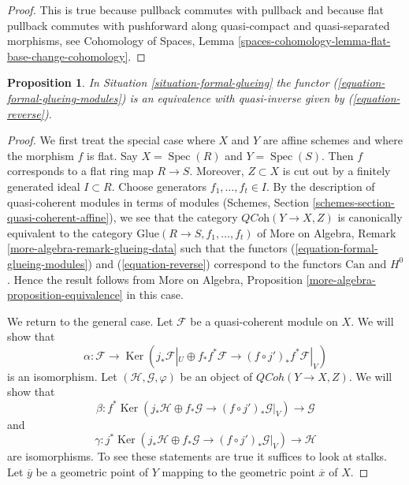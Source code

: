 \documentclass{stacks-project}
\theoremstyle{plain}
\newtheorem{proposition}[subsection]{Proposition}
\theoremstyle{definition}
\theoremstyle{remark}
\numberwithin{equation}{subsection}
\def\Spec{\mathop{\mathrm{Spec}}}
\def\QCoh{\mathit{QCoh}}
\def\Ker{\mathop{\mathrm{Ker}}}
\begin{document}
\begin{proof}
This is true because pullback commutes with pullback and because
flat pullback commutes with pushforward along quasi-compact
and quasi-separated morphisms, see
Cohomology of Spaces, Lemma
\ref{spaces-cohomology-lemma-flat-base-change-cohomology}.
\end{proof}

\begin{proposition}
\label{proposition-formal-glueing-modules}
In Situation \ref{situation-formal-glueing} the functor
(\ref{equation-formal-glueing-modules}) is an equivalence
with quasi-inverse given by (\ref{equation-reverse}).
\end{proposition}

\begin{proof}
We first treat the special case where $X$ and $Y$ are affine schemes
and where the morphism $f$ is flat. Say $X = \Spec(R)$ and $Y = \Spec(S)$.
Then $f$ corresponds to a flat ring map $R \to S$. Moreover, $Z \subset X$
is cut out by a finitely generated ideal $I \subset R$. Choose generators
$f_1, \ldots, f_t \in I$. By the description of quasi-coherent modules
in terms of modules
(Schemes, Section \ref{schemes-section-quasi-coherent-affine}),
we see that the category $\textit{QCoh}(Y \to X, Z)$
is canonically equivalent to the category
$\text{Glue}(R \to S, f_1, \ldots, f_t)$
of More on Algebra, Remark \ref{more-algebra-remark-glueing-data}
such that the functors
(\ref{equation-formal-glueing-modules}) and (\ref{equation-reverse})
correspond to the functors $\text{Can}$ and $H^0$.
Hence the result follows from
More on Algebra, Proposition \ref{more-algebra-proposition-equivalence}
in this case.

\medskip\noindent
We return to the general case.
Let $\mathcal{F}$ be a quasi-coherent module on $X$.
We will show that
$$
\alpha :
\mathcal{F}
\longrightarrow
\Ker\left(j_*\mathcal{F}|_U \oplus f_*f^*\mathcal{F} \to
(f \circ j')_*f^*\mathcal{F}|_V\right)
$$
is an isomorphism. Let $(\mathcal{H}, \mathcal{G}, \varphi)$
be an object of $\QCoh(Y \to X, Z)$. We will show that
$$
\beta :
f^*\Ker\left(
j_*\mathcal{H} \oplus f_*\mathcal{G} \to (f \circ j')_*\mathcal{G}|_V
\right)
\longrightarrow
\mathcal{G}
$$
and
$$
\gamma :
j^*\Ker\left(
j_*\mathcal{H} \oplus f_*\mathcal{G} \to (f \circ j')_*\mathcal{G}|_V
\right)
\longrightarrow
\mathcal{H}
$$
are isomorphisms. To see these statements are true it suffices to
look at stalks. Let $\overline{y}$ be a geometric point of $Y$ mapping
to the geometric point $\overline{x}$ of $X$.


\end{proof}
\end{document}

